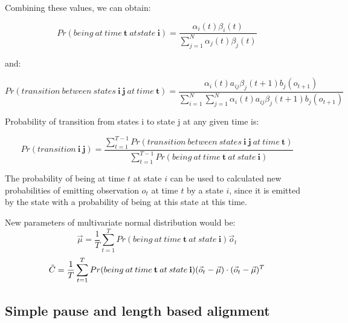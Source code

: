 \documentclass[12pt,a4paper,english]{article}
\begin{document}
\newpage

Combining these values, we can obtain:

\begin{equation}
    Pr(being \: at \: time \: \boldsymbol{t} \: at state \: \boldsymbol{i}) = \frac {\alpha_i(t)\beta_i(t)} {\sum_{j=1}^{N} \alpha_j(t)\beta_j(t) }
\end{equation}
	
and:
	
\begin{equation}
    Pr(transition \: between \: states \: \boldsymbol{i} \: \boldsymbol{j} \: at \: time \: \boldsymbol{t}) = \frac {\alpha_i(t)a_{ij}\beta_j(t + 1)b_j(o_{t+1})} {\sum_{i=1}^{N} \sum_{j=1}^{N} \alpha_i(t)a_{ij}\beta_j(t + 1)b_j(o_{t+1})}
\end{equation}

Probability of transition from states i to state j at any given time is:
	
\begin{equation}
    Pr(transition \: \boldsymbol{i} \: \boldsymbol{j}) = \frac {\sum_{t=1}^{T-1} Pr(transition \: between \: states \: \boldsymbol{i} \: \boldsymbol{j} \: at \: time \: \boldsymbol{t})} {\sum_{t=1}^{T-1} Pr(being \: at \: time \: \boldsymbol{t} \: at \: state \: \boldsymbol{i}) }
\end{equation}
	

The probability of being at time $t$ at state $i$ can be used to calculated new probabilities of emitting observation $o_t$ at time $t$ by a state $i$,
since it is emitted by the state with a probability of being at this state at this time. \newline

New parameters of multivariate normal distribution would be:
\begin{equation}
    \vec \mu = \frac 1 T \sum_{t=1}^{T} Pr(being \: at \: time \: \boldsymbol{t} \: at \: state \: \boldsymbol{i}) \vec o_t
\end{equation}
\begin{equation}
    \tilde C = \frac 1 T \sum_{t=1}^{T} Pr(being \: at \: time \: \bold{t} \: at \: state \: \bold{i})(\vec o_t - \vec \mu) \cdot (\vec o_t - \vec \mu)^T
\end{equation}


\newpage
\begin{center}
    \section{Simple pause and length based alignment}
\end {center}
\setcounter{equation}{0}
\end{document}
